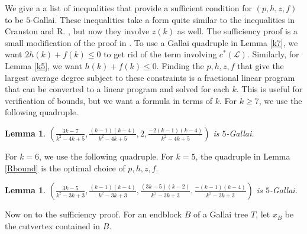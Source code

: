 \documentclass[10pt]{article}
\renewcommand{\ge}{\geqslant}
\renewcommand{\le}{\leqslant}
\theoremstyle{plain}
\newtheorem{lem}[thm]{Lemma}
\theoremstyle{definition}
\theoremstyle{remark}
\newcommand{\fancy}[1]{\mathcal{#1}}
\renewcommand{\L}{\fancy{L}}
\newcommand{\parens}[1]{\left( #1 \right)}
\begin{document}
We give a a list of inequalities that provide a sufficient condition for $(p,h,z,f)$ to be $5$-Gallai.  
These inequalities take a form quite similar to the inequalities in Cranston and R. \cite{DischargingLowerBound}, but now
they involve $z(k)$ as well.   The sufficiency proof is a small modification of the proof in \cite{DischargingLowerBound}. 
To use a Gallai quadruple in Lemma \ref{k7}, we want $2h(k) + f(k) \le 0$ to get rid of the term involving $c^*(\L)$.  Similarly,
for Lemma \ref{k5}, we want $h(k) + f(k) \le 0$.   Finding the $p,h,z,f$ that give the largest average degree subject to these constraints
is a fractional linear program that can be converted to a linear program and solved for each $k$.  This is useful
for verification of bounds, but we want a formula in terms of $k$.  For $k \ge 7$, we use the following quadruple.

\begin{lem}\label{Gallai7Up}
$\parens{\frac{3k-7}{k^2-4k+5}, \frac{(k-1)(k-4)}{k^2-4k+5}, 2, \frac{-2(k-1)(k-4)}{k^2-4k+5}}$ is $5$-Gallai.
\end{lem}

\noindent For $k=6$, we use the following quadruple.  For $k=5$, the quadruple in Lemma \ref{Rbound} is the optimal choice of $p,h,z,f$.

\begin{lem}\label{Gallai6Up}
$\parens{\frac{3k-5}{k^2-3k+3}, \frac{(k-1)(k-4)}{k^2-3k+3}, \frac{(3k-5)(k-2)}{k^2-3k+3}, \frac{-(k-1)(k-4)}{k^2-3k+3}}$ is $5$-Gallai.
\end{lem}

\noindent Now on to the sufficiency proof.  For an endblock $B$ of a Gallai tree $T$, let $x_B$ be the cutvertex contained in $B$.
\end{document}

